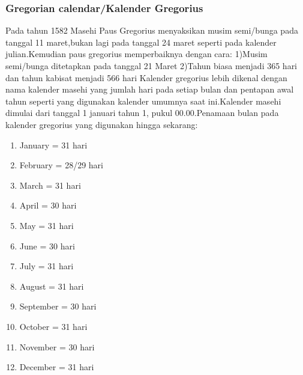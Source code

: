     \subsubsection{Gregorian calendar/Kalender Gregorius}
      Pada tahun 1582 Masehi Paus Gregorius menyaksikan musim semi/bunga pada tanggal 11 maret,bukan lagi pada tanggal 24 maret seperti pada kalender julian.Kemudian paus gregorius memperbaiknya dengan cara:
      1)Musim semi/bunga ditetapkan pada tanggal 21 Maret
      2)Tahun biasa menjadi 365 hari dan tahun kabisat menjadi 566 hari
      Kalender gregorius lebih dikenal dengan nama kalender masehi yang jumlah hari pada setiap bulan dan pentapan awal tahun seperti yang digunakan kalender umumnya saat ini.Kalender masehi dimulai dari tanggal 1 januari
      tahun 1, pukul 00.00.Penamaan bulan pada kalender gregorius yang digunakan hingga sekarang:
      \begin{enumerate}
        \item  January   = 31 hari
        \item  February  = 28/29 hari
        \item  March     = 31 hari
        \item  April     = 30 hari
        \item  May       = 31 hari
        \item  June      = 30 hari
        \item  July      = 31 hari
        \item  August    = 31 hari
        \item  September = 30 hari
        \item  October  = 31 hari
        \item  November = 30 hari
        \item  December = 31 hari
      \end{enumerate}

